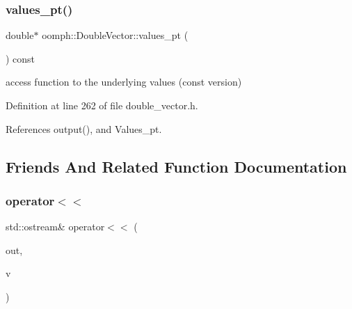 \mbox{\label{classoomph_1_1DoubleVector_ab88fb798be9cc01d3f3fb64db2c8c9f6}} 
\subsubsection{\texorpdfstring{values\+\_\+pt()}{values\_pt()}\hspace{0.1cm}{\footnotesize\ttfamily [2/2]}}
{\footnotesize\ttfamily double$\ast$ oomph\+::\+Double\+Vector\+::values\+\_\+pt (\begin{DoxyParamCaption}{ }\end{DoxyParamCaption}) const\hspace{0.3cm}{\ttfamily [inline]}}



access function to the underlying values (const version) 



Definition at line 262 of file double\+\_\+vector.\+h.



References output(), and Values\+\_\+pt.



\subsection{Friends And Related Function Documentation}
\mbox{\label{classoomph_1_1DoubleVector_a738e90fa5474b2ab868b50d76347a20d}} 
\subsubsection{\texorpdfstring{operator$<$$<$}{operator<<}}
{\footnotesize\ttfamily std\+::ostream\& operator$<$$<$ (\begin{DoxyParamCaption}\item[{std\+::ostream \&}]{out,  }\item[{const \hyperlink{classoomph_1_1DoubleVector}{Double\+Vector} \&}]{v }\end{DoxyParamCaption})\hspace{0.3cm}{\ttfamily [friend]}}



